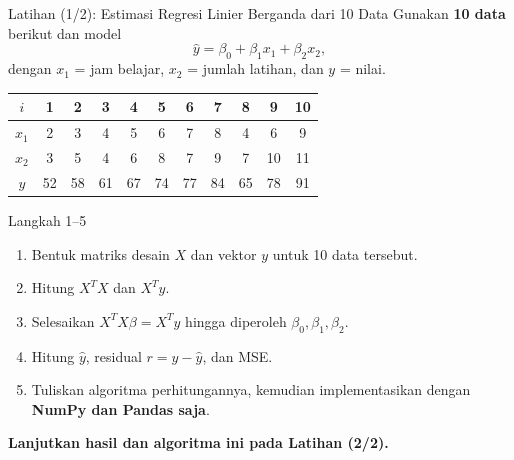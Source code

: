 \documentclass[aspectratio=169,11pt]{beamer}
\begin{document}
\begin{frame}{Latihan (1/2): Estimasi Regresi Linier Berganda dari 10 Data}
\footnotesize
Gunakan \textbf{10 data} berikut dan model
\[
\hat y=\beta_0+\beta_1x_1+\beta_2x_2,
\]
dengan $x_1$ = jam belajar, $x_2$ = jumlah latihan, dan $y$ = nilai.
\begin{center}
\renewcommand{\arraystretch}{0.98}
\begin{tabular}{c|cccccccccc}
$i$ & 1&2&3&4&5&6&7&8&9&10 \\ \hline
$x_1$ & 2&3&4&5&6&7&8&4&6&9 \\
$x_2$ & 3&5&4&6&8&7&9&7&10&11 \\
$y$   & 52&58&61&67&74&77&84&65&78&91
\end{tabular}
\end{center}
\begin{block}{Langkah 1--5}
\footnotesize
\begin{enumerate}
  \item Bentuk matriks desain $X$ dan vektor $y$ untuk 10 data tersebut.
  \item Hitung $X^TX$ dan $X^Ty$.
  \item Selesaikan $X^TX\beta=X^Ty$ hingga diperoleh $\beta_0,\beta_1,\beta_2$.
  \item Hitung $\hat y$, residual $r=y-\hat y$, dan MSE.
  \item Tuliskan algoritma perhitungannya, kemudian implementasikan dengan \textbf{NumPy dan Pandas saja}.
\end{enumerate}
\end{block}
{\footnotesize \textbf{Lanjutkan hasil dan algoritma ini pada Latihan (2/2).}}
\end{frame}
\end{document}
